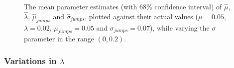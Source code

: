 \documentclass[11pt,oneside,openany,a4paper,english, report, goldenblock
]{usthesis}
\begin{document}
\begin{figure}[h]
{\begin{subfloatrow}
		\end{subfloatrow}
%			
%			
		}{
		\caption{The mean parameter estimates (with $68\%$ confidence interval) of $\hat{\mu}$, $\hat{\lambda}$, $\hat{\mu}_{jumps}$ and $\hat{\sigma}_{jumps}$, plotted against their actual values ($\mu = 0.05$, $\lambda = 0.02$, $\mu_{jumps} = 0.05$ and $\sigma_{jumps} = 0.07$), while varying the $\sigma$ parameter in the range $\left(0, 0.2\right)$.}
		\label{fig:sensitivity_test:multiple_output:varying_sigma}}
\end{figure}




\subsubsection{Variations in $\lambda$}
\end{document}
